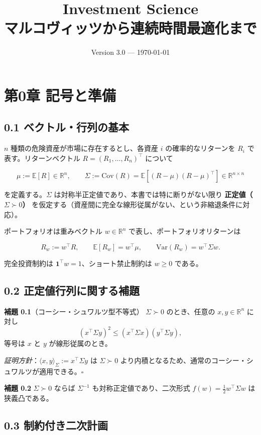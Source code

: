 \documentclass[11pt,a4paper]{report}
\title{Investment Science \\ \large マルコヴィッツから連続時間最適化まで}
\author{}
\date{Version 3.0 — \today}
\begin{document}
\maketitle
\tableofcontents
\clearpage

\chapter{第0章 記号と準備}

\section{0.1 ベクトル・行列の基本}

$n$ 種類の危険資産が市場に存在するとし、各資産 $i$ の確率的なリターンを $R_i$ で表す。リターンベクトル $R = (R_1, \dots, R_n)^\top$ について

\[ \mu := \mathbb{E}[R] \in \mathbb{R}^n, \qquad \Sigma := \mathrm{Cov}(R) = \mathbb{E}[(R-\mu)(R-\mu)^\top] \in \mathbb{R}^{n\times n} \]

を定義する。$\Sigma$ は対称半正定値であり、本書では特に断りがない限り \textbf{正定値（$\Sigma \succ 0$）} を仮定する（資産間に完全な線形従属がない、という非縮退条件に対応）。

ポートフォリオは重みベクトル $w \in \mathbb{R}^n$ で表し、ポートフォリオリターンは

\[ R_w := w^\top R, \qquad \mathbb{E}[R_w] = w^\top \mu, \qquad \mathrm{Var}(R_w) = w^\top \Sigma w. \]

完全投資制約は $\mathbf{1}^\top w = 1$、ショート禁止制約は $w \ge 0$ である。

\section{0.2 正定値行列に関する補題}

\textbf{補題 0.1}（コーシー・シュワルツ型不等式） $\Sigma \succ 0$ のとき、任意の $x, y \in \mathbb{R}^n$ に対し \[ (x^\top \Sigma y)^2 \le (x^\top \Sigma x)(y^\top \Sigma y), \] 等号は $x$ と $y$ が線形従属のとき。

\emph{証明方針}：$\langle x, y\rangle_\Sigma := x^\top \Sigma y$ は $\Sigma \succ 0$ より内積となるため、通常のコーシー・シュワルツが適用できる。$\square$

\textbf{補題 0.2} $\Sigma \succ 0$ ならば $\Sigma^{-1}$ も対称正定値であり、二次形式 $f(w) = \tfrac{1}{2} w^\top \Sigma w$ は狭義凸である。

\section{0.3 制約付き二次計画}
\end{document}
